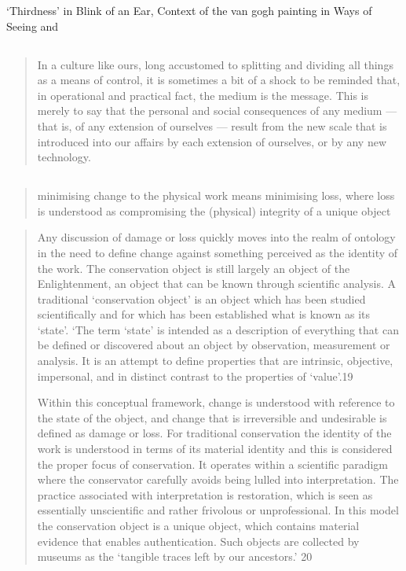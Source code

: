 `Thirdness' in Blink of an Ear, Context of the van gogh painting in Ways of
Seeing \cite{berger_ways_1972} and

\subsection{\cite{mcluhan_understanding_1964}}

\begin{quotation}
In a culture like ours, long accustomed to splitting and dividing all things as
a means of control, it is sometimes a bit of a shock to be reminded that, in
operational and practical fact, the medium is the message. This is merely to say
that the personal and social consequences of any medium — that is, of any
extension of ourselves — result from the new scale that is introduced into our
affairs by each extension of ourselves, or by any new technology.
\end{quotation}
\cite{mcluhan_understanding_1964}

\subsection{\cite{laurenson_authenticity_2006}}

\begin{quotation}
minimising change to the physical work means minimising loss, where loss is
understood as compromising the (physical) integrity of a unique object
\end{quotation}

\begin{quotation}
Any discussion of damage or loss quickly moves into the realm of ontology in the
need to define change against something perceived as the identity of the work.
The conservation object is still largely an object of the Enlightenment, an
object that can be known through scientific analysis. A traditional
‘conservation object’ is an object which has been studied scientifically and for
which has been established what is known as its ‘state’. ‘The term ‘state’ is
intended as a description of everything that can be defined or discovered about
an object by observation, measurement or analysis. It is an attempt to define
properties that are intrinsic, objective, impersonal, and in distinct contrast
to the properties of ‘value’.19

Within this conceptual framework, change is understood with reference to the
state of the object, and change that is irreversible and undesirable is defined
as damage or loss. For traditional conservation the identity of the work is
understood in terms of its material identity and this is considered the proper
focus of conservation. It operates within a scientific paradigm where the
conservator carefully avoids being lulled into interpretation. The practice
associated with interpretation is restoration, which is seen as essentially
unscientific and rather frivolous or unprofessional. In this model the
conservation object is a unique object, which contains material evidence that
enables authentication. Such objects are collected by museums as the ‘tangible
traces left by our ancestors.’ 20
\end{quotation}


